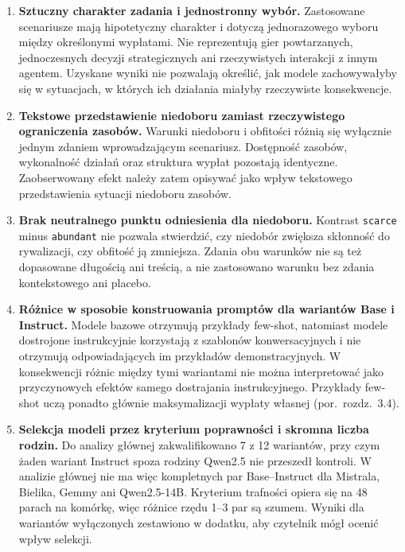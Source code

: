 \documentclass[11pt]{article}
\begin{document}
\begin{enumerate}[leftmargin=1.6em,itemsep=0.25em]

    \item \textbf{Sztuczny charakter zadania i jednostronny wybór.}
    Zastosowane scenariusze mają hipotetyczny charakter i dotyczą jednorazowego wyboru między określonymi wypłatami. Nie reprezentują gier powtarzanych, jednoczesnych decyzji strategicznych ani rzeczywistych interakcji z innym agentem. Uzyskane wyniki nie pozwalają określić, jak modele zachowywałyby się w sytuacjach, w których ich działania miałyby rzeczywiste konsekwencje.

    \item \textbf{Tekstowe przedstawienie niedoboru zamiast rzeczywistego ograniczenia zasobów.}
    Warunki niedoboru i obfitości różnią się wyłącznie jednym zdaniem wprowadzającym scenariusz. Dostępność zasobów, wykonalność działań oraz struktura wypłat pozostają identyczne. Zaobserwowany efekt należy zatem opisywać jako wpływ tekstowego przedstawienia sytuacji niedoboru zasobów.

    \item \textbf{Brak neutralnego punktu odniesienia dla niedoboru.}
    Kontrast \texttt{scarce} minus \texttt{abundant} nie pozwala stwierdzić, czy niedobór zwiększa skłonność do rywalizacji, czy obfitość ją zmniejsza. Zdania obu warunków nie są też dopasowane długością ani treścią, a nie zastosowano warunku bez zdania kontekstowego ani placebo.

    \item \textbf{Różnice w sposobie konstruowania promptów dla wariantów Base i Instruct.}
    Modele bazowe otrzymują przykłady few-shot, natomiast modele dostrojone instrukcyjnie korzystają z szablonów konwersacyjnych i nie otrzymują odpowiadających im przykładów demonstracyjnych. W konsekwencji różnic między tymi wariantami nie można interpretować jako przyczynowych efektów samego dostrajania instrukcyjnego. Przykłady few-shot uczą ponadto głównie maksymalizacji wypłaty własnej (por.\ rozdz.~3.4).

    \item \textbf{Selekcja modeli przez kryterium poprawności i skromna liczba rodzin.}
    Do analizy głównej zakwalifikowano 7 z 12 wariantów, przy czym żaden wariant Instruct spoza rodziny Qwen2.5 nie przeszedł kontroli. W analizie głównej nie ma więc kompletnych par Base--Instruct dla Mistrala, Bielika, Gemmy ani Qwen2.5-14B. Kryterium trafności opiera się na 48 parach na komórkę, więc różnice rzędu 1--3 par są szumem. Wyniki dla wariantów wyłączonych zestawiono w dodatku, aby czytelnik mógł ocenić wpływ selekcji.


\end{enumerate}
\end{document}
